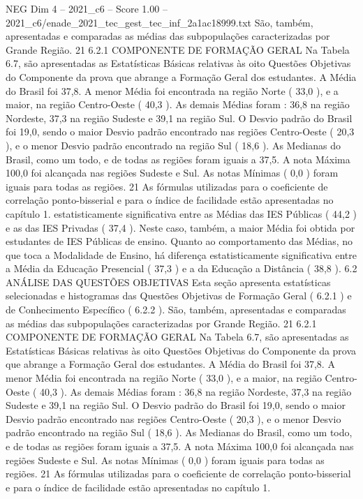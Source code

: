 \begin{textsample}{NEG Dim 4 – 2021\_c6 – Score 1.00 – 2021\_c6/enade\_2021\_tec\_gest\_tec\_inf\_2a1ac18999.txt}
São, também, apresentadas e comparadas as médias das subpopulações caracterizadas por Grande Região. 21 6.2.1 COMPONENTE DE FORMAÇÃO GERAL Na Tabela 6.7, são apresentadas as Estatísticas Básicas relativas às oito Questões Objetivas do Componente da prova que abrange a Formação Geral dos estudantes.
A Média do Brasil foi 37,8.
A menor Média foi encontrada na região Norte ( 33,0 ), e a maior, na região Centro-Oeste ( 40,3 ).
As demais Médias foram : 36,8 na região Nordeste, 37,3 na região Sudeste e 39,1 na região Sul.
O Desvio padrão do Brasil foi 19,0, sendo o maior Desvio padrão encontrado nas regiões Centro-Oeste ( 20,3 ), e o menor Desvio padrão encontrado na região Sul ( 18,6 ).
As Medianas do Brasil, como um todo, e de todas as regiões foram iguais a 37,5.
A nota Máxima 100,0 foi alcançada nas regiões Sudeste e Sul.
As notas Mínimas ( 0,0 ) foram iguais para todas as regiões. 21 As fórmulas utilizadas para o coeficiente de correlação ponto-bisserial e para o índice de facilidade estão apresentadas no capítulo 1. estatisticamente significativa entre as Médias das IES Públicas ( 44,2 ) e as das IES Privadas ( 37,4 ).
Neste caso, também, a maior Média foi obtida por estudantes de IES Públicas de ensino.
Quanto ao comportamento das Médias, no que toca a Modalidade de Ensino, há diferença estatisticamente significativa entre a Média da Educação Presencial ( 37,3 ) e a da Educação a Distância ( 38,8 ). 6.2 ANÁLISE DAS QUESTÕES OBJETIVAS Esta seção apresenta estatísticas selecionadas e histogramas das Questões Objetivas de Formação Geral ( 6.2.1 ) e de Conhecimento Específico ( 6.2.2 ).
São, também, apresentadas e comparadas as médias das subpopulações caracterizadas por Grande Região. 21 6.2.1 COMPONENTE DE FORMAÇÃO GERAL Na Tabela 6.7, são apresentadas as Estatísticas Básicas relativas às oito Questões Objetivas do Componente da prova que abrange a Formação Geral dos estudantes.
A Média do Brasil foi 37,8.
A menor Média foi encontrada na região Norte ( 33,0 ), e a maior, na região Centro-Oeste ( 40,3 ).
As demais Médias foram : 36,8 na região Nordeste, 37,3 na região Sudeste e 39,1 na região Sul.
O Desvio padrão do Brasil foi 19,0, sendo o maior Desvio padrão encontrado nas regiões Centro-Oeste ( 20,3 ), e o menor Desvio padrão encontrado na região Sul ( 18,6 ).
As Medianas do Brasil, como um todo, e de todas as regiões foram iguais a 37,5.
A nota Máxima 100,0 foi alcançada nas regiões Sudeste e Sul.
As notas Mínimas ( 0,0 ) foram iguais para todas as regiões. 21 As fórmulas utilizadas para o coeficiente de correlação ponto-bisserial e para o índice de facilidade estão apresentadas no capítulo 1.

\end{textsample}

